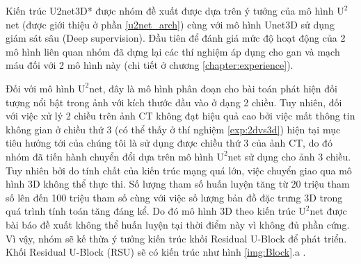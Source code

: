 Kiến trúc U2net3D* được nhóm đề xuất được dựa trên ý tưởng của mô hình $\mathrm{U}^2$net (được giới thiệu ở phần \ref{u2net_arch}) cùng với mô hình Unet3D sử dụng giám sát sâu (Deep supervision). Đầu tiên để đánh giá mức độ hoạt động của 2 mô hình liên quan nhóm đã dựng lại các thí nghiệm áp dụng cho gan và mạch máu đối với 2 mô hình này (chi tiết ở chương \ref{chapter:experience}). 

Đối với mô hình $\mathrm{U}^2$net, đây là mô hình phân đoạn cho bài toán phát hiện đối tượng nổi bật trong ảnh với kích thước đầu vào ở dạng 2 chiều. Tuy nhiên, đối với việc xử lý 2 chiều trên ảnh CT không đạt hiệu quả cao bởi việc mất thông tin không gian ở chiều thứ 3 (có thể thấy ở thí nghiệm \ref{exp:2dvs3d}) hiện tại mục tiêu hướng tới của chúng tôi là sử dụng được chiều thứ 3 của ảnh CT, do đó nhóm đã tiến hành chuyển đổi dựa trên mô hình $\mathrm{U}^2$net sử dụng cho ảnh 3 chiều. Tuy nhiên bởi do tính chất của kiến trúc mạng quá lớn, việc chuyển giao qua mô hình 3D không thể thực thi. Số lượng tham số huấn luyện tăng từ 20 triệu tham số lên đến 100 triệu tham số cùng với việc số lượng bản đồ đặc trưng 3D trong quá trình tính toán tăng đáng kể. Do đó mô hình 3D theo kiến trúc $\mathrm{U}^2$net được bài báo đề xuất không thể huấn luyện tại thời điểm này vì không đủ phần cứng. Vì vậy, nhóm sẽ kế thừa ý tưởng kiến trúc khối Residual U-Block để phát triển. Khối Residual U-Block (RSU) sẽ có kiến trúc như hình \ref{img:Block}.a .

